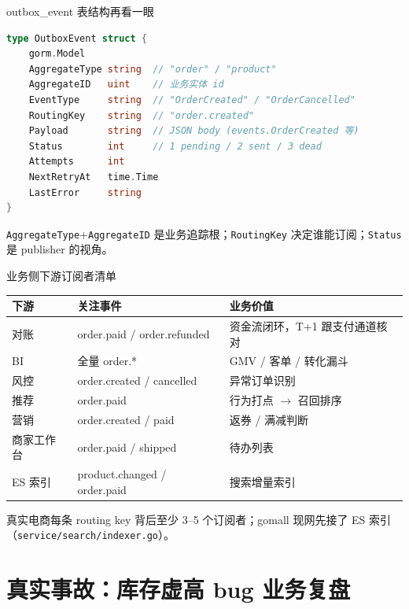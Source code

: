 \begin{frame}[fragile]{outbox\_event 表结构再看一眼}
\begin{lstlisting}[language=Go,firstnumber=24,
  caption={\srcnote{repository/db/model/outbox.go:24--35}}]
type OutboxEvent struct {
    gorm.Model
    AggregateType string  // "order" / "product"
    AggregateID   uint    // 业务实体 id
    EventType     string  // "OrderCreated" / "OrderCancelled"
    RoutingKey    string  // "order.created"
    Payload       string  // JSON body (events.OrderCreated 等)
    Status        int     // 1 pending / 2 sent / 3 dead
    Attempts      int
    NextRetryAt   time.Time
    LastError     string
}
\end{lstlisting}
\small \texttt{AggregateType}+\texttt{AggregateID} 是业务追踪根；\texttt{RoutingKey} 决定谁能订阅；\texttt{Status} 是 publisher 的视角。
\end{frame}

\begin{frame}{业务侧下游订阅者清单}
\begin{tabular}{@{}lll@{}}
\toprule
下游 & 关注事件 & 业务价值 \\
\midrule
对账 & order.paid / order.refunded & 资金流闭环，T+1 跟支付通道核对 \\
BI & 全量 order.* & GMV / 客单 / 转化漏斗 \\
风控 & order.created / cancelled & 异常订单识别 \\
推荐 & order.paid & 行为打点 $\to$ 召回排序 \\
营销 & order.created / paid & 返券 / 满减判断 \\
商家工作台 & order.paid / shipped & 待办列表 \\
ES 索引 & product.changed / order.paid & 搜索增量索引 \\
\bottomrule
\end{tabular}
\vspace{2mm}
\small 真实电商每条 routing key 背后至少 3--5 个订阅者；gomall 现网先接了 ES 索引（\texttt{service/search/indexer.go}）。
\end{frame}

\section{真实事故：库存虚高 bug 业务复盘}

